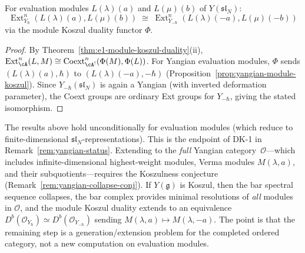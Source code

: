 \begin{corollary}
\label{cor:yangian-ext-exchange}
For evaluation modules $L(\lambda)(a)$ and $L(\mu)(b)$
of $Y(\mathfrak{sl}_N)$:
\[
\operatorname{Ext}^n_{Y_\hbar}(L(\lambda)(a), L(\mu)(b))
\;\cong\;
\operatorname{Ext}^n_{Y_{-\hbar}}(L(\lambda)(-a), L(\mu)(-b))
\]
via the module Koszul duality functor $\Phi$.
\end{corollary}

\begin{proof}
By Theorem~\ref{thm:e1-module-koszul-duality}(ii),
$\operatorname{Ext}^n_{\cA}(L, M)
\cong \operatorname{Coext}^n_{\cA^!}(\Phi(M), \Phi(L))$.
For Yangian evaluation modules, $\Phi$ sends
$(L(\lambda)(a), \hbar)$ to $(L(\lambda)(-a), -\hbar)$
(Proposition~\ref{prop:yangian-module-koszul}).
Since $Y_{-\hbar}(\mathfrak{sl}_N)$ is again a Yangian
(with inverted deformation parameter), the Coext
groups are ordinary Ext groups for $Y_{-\hbar}$, giving
the stated isomorphism.
\end{proof}

\begin{remark}
\label{rem:yangian-cat-O-conditional}
The results above hold unconditionally for
evaluation modules (which reduce to finite-dimensional
$\mathfrak{sl}_N$-representations).  This is the endpoint of DK-1 in
Remark~\ref{rem:yangian-status}.  Extending to
the \emph{full} Yangian category~$\mathcal{O}$---which
includes infinite-dimensional highest-weight modules,
Verma modules $M(\lambda, a)$, and their subquotients---requires
the Koszulness conjecture
(Remark~\ref{rem:yangian-collapse-conj}).  If $Y(\mathfrak{g})$
is Koszul, then the bar spectral sequence collapses,
the bar complex provides minimal resolutions of
\emph{all} modules in $\mathcal{O}$, and the module
Koszul duality extends to an equivalence
$D^b(\mathcal{O}_{Y_\hbar}) \simeq
D^b(\mathcal{O}_{Y_{-\hbar}})$
sending $M(\lambda, a) \mapsto M(\lambda, -a)$.  The point is that the
remaining step is a generation/extension problem for the completed
ordered category, not a new computation on evaluation modules.
\end{remark}

